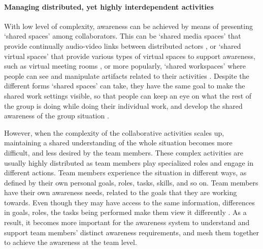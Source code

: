 \paragraph*{Managing distributed, yet highly interdependent activities}
With low level of complexity, awareness can be achieved by means of presenting `shared spaces' among collaborators. This can be `shared media spaces' that provide continually audio-video links between distributed actors \cite{Dourish1992}, or `shared virtual spaces' that provide various types of virtual spaces to support awareness, such as virtual meeting rooms \cite{Berlage1999}, or more popularly, `shared workspaces' where people can see and manipulate artifacts related to their activities \cite{Gutwin2002}. Despite the different forms `shared spaces' can take, they have the same goal to make the shared work settings visible, so that people can keep an eye on what the rest of the group is doing while doing their individual work, and develop the shared awareness of the group situation \cite{schmidt2002a}.

However, when the complexity of the collaborative activities scales up, maintaining a shared understanding of the whole situation becomes more difficult, and less desired by the team members. These complex activities are usually highly distributed as team members play specialized roles and engage in different actions. Team members experience the situation in different ways, as defined by their own personal goals, roles, tasks, skills, and so on. Team members have their own awareness needs, related to the goals that they are working towards. Even though they may have access to the same information, differences in goals, roles, the tasks being performed make them view it differently \cite{Salmon2010}. As a result, it becomes more important for the awareness system to understand and support team members' distinct awareness requirements, and mesh them together to achieve the awareness at the team level. 

